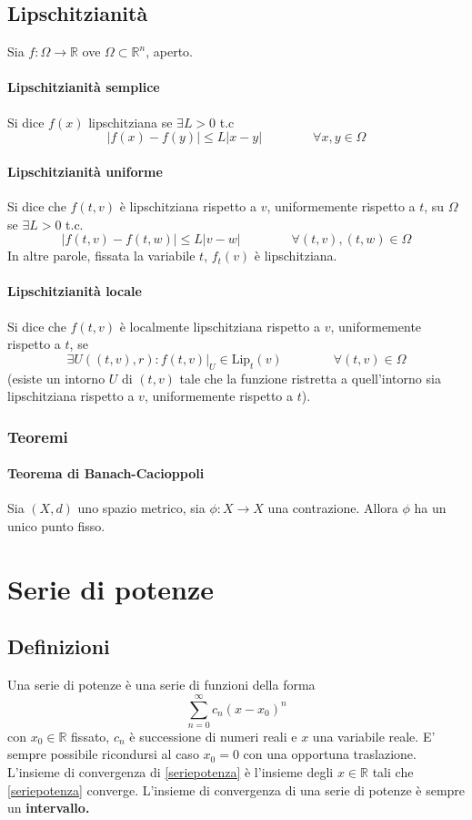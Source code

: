 \documentclass[a4paper,12pt]{article}
\begin{document}
\subsection{Lipschitzianità}
Sia $f:\Omega\rightarrow\mathbb{R}$ ove $\Omega\subset\mathbb{R}^n$, aperto.
\paragraph{Lipschitzianità semplice}
Si dice $f\left(x\right)$ lipschitziana se $\exists L>0$ t.c
$$ |f\left(x\right)- f\left(y\right)| \leq L|x-y|\qquad\qquad\forall x,y \in \Omega $$

\paragraph{Lipschitzianità uniforme}
Si dice che $f(t, v)$ è lipschitziana rispetto a $v$, uniformemente rispetto a $t$, su $\Omega$ se $\exists L>0$ t.c.
$$|f(t, v) - f(t, w)| \leq L|v-w|\qquad\qquad\forall (t,v), (t, w) \in \Omega$$
In altre parole, fissata la variabile $t$, $f_t(v)$ è lipschitziana.

\paragraph{Lipschitzianità locale}
Si dice che $f(t, v)$ è localmente lipschitziana rispetto a $v$, uniformemente rispetto a $t$, se
$$\exists U((t, v), r) : f(t, v)|_U \in \text{Lip}_t(v)\qquad\qquad\forall(t, v)\in \Omega$$
(esiste un intorno $U$ di $(t, v)$ tale che la funzione ristretta a quell'intorno sia lipschitziana rispetto a $v$, uniformemente rispetto a $t$).

\subsubsection{Teoremi}
\paragraph{Teorema di Banach-Cacioppoli}
Sia $(X, d)$ uno spazio metrico, sia $\phi : X\rightarrow X$ una contrazione.
Allora $\phi$ ha un unico punto fisso.

\section{Serie di potenze}
\subsection{Definizioni}
Una serie di potenze è una serie di funzioni della forma
$$\label{seriepotenza} \displaystyle \sum_{n=0}^\infty c_n\left(x-x_0\right)^n$$
con $x_0 \in \mathbb{R}$ fissato, ${c_n}$ è successione di numeri reali e $x$ una variabile reale. 
E' sempre possibile ricondursi al caso $x_0 = 0$ con una opportuna traslazione. L'insieme di convergenza di \ref{seriepotenza} è l'insieme degli $x \in \mathbb{R}$ tali che \ref{seriepotenza} converge. L'insieme di convergenza di una serie di potenze è sempre un \textbf{intervallo.}
\end{document}
